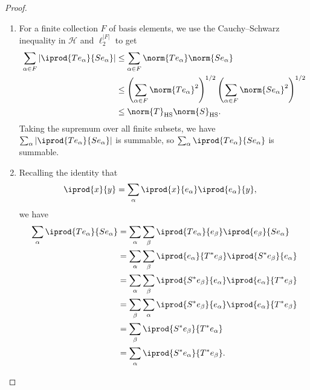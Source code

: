 \documentclass[10pt]{mypackage}
\DeclareMathOperator{\hs}{HS}
\begin{document}
\begin{proof}
  \begin{enumerate}[(1)]
    \item For a finite collection $F$ of basis elements, we use the Cauchy--Schwarz inequality in $\mathcal{H}$ and $\ell_2^{\left\vert F \right\vert}$ to get
      \begin{align*}
        \sum_{\alpha\in F}\left\vert \iprod{Te_{\alpha}}{Se_{\alpha}} \right\vert &\leq \sum_{\alpha\in F}\norm{Te_{\alpha}}\norm{Se_{\alpha}}\\
                                                                                  &\leq \left( \sum_{\alpha\in F}\norm{Te_{\alpha}}^2 \right)^{1/2}\left( \sum_{\alpha\in F}\norm{Se_{\alpha}}^2 \right)^{1/2}\\
                                                                                  &\leq \norm{T}_{\hs}\norm{S}_{\hs}.
      \end{align*}
      Taking the supremum over all finite subsets, we have $\sum_{\alpha}\left\vert \iprod{Te_{\alpha}}{Se_{\alpha}} \right\vert$ is summable, so $\sum_{\alpha} \iprod{Te_{\alpha}}{Se_{\alpha}}$ is summable.
    \item Recalling the identity that
      \begin{align*}
        \iprod{x}{y} &= \sum_{\alpha} \iprod{x}{e_{\alpha}} \iprod{e_{\alpha}}{y},
      \end{align*}
      we have
      \begin{align*}
        \sum_{\alpha} \iprod{Te_{\alpha}}{Se_{\alpha}} &= \sum_{\alpha}\sum_{\beta} \iprod{Te_{\alpha}}{e_{\beta}} \iprod{e_{\beta}}{Se_{\alpha}}\\
                                                       &= \sum_{\alpha}\sum_{\beta} \iprod{e_{\alpha}}{T^{\ast}e_{\beta}} \iprod{S^{\ast}e_{\beta}}{e_{\alpha}}\\
                                                       &= \sum_{\alpha}\sum_{\beta} \iprod{S^{\ast}e_{\beta}}{e_{\alpha}} \iprod{e_{\alpha}}{T^{\ast}e_{\beta}}\\
                                                       &= \sum_{\beta}\sum_{\alpha} \iprod{S^{\ast}e_{\beta}}{e_{\alpha}} \iprod{e_{\alpha}}{T^{\ast}e_{\beta}}\\
                                                       &= \sum_{\beta} \iprod{S^{\ast}e_{\beta}}{T^{\ast}e_{\alpha}}\\
                                                       &= \sum_{\alpha} \iprod{S^{\ast}e_{\alpha}}{T^{\ast}e_{\beta}}.

\end{align*}
\end{enumerate}
\end{proof}
\end{document}
